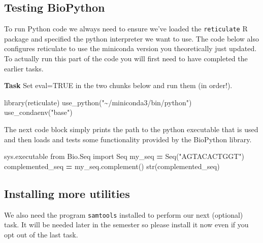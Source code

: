 \documentclass[
]{article}
\newenvironment{Shaded}{\begin{snugshade}}{\end{snugshade}}
\newcommand{\BuiltInTok}[1]{#1}
\newcommand{\FunctionTok}[1]{\textcolor[rgb]{0.00,0.00,0.00}{#1}}
\newcommand{\ImportTok}[1]{#1}
\newcommand{\NormalTok}[1]{#1}
\newcommand{\OperatorTok}[1]{\textcolor[rgb]{0.81,0.36,0.00}{\textbf{#1}}}
\newcommand{\StringTok}[1]{\textcolor[rgb]{0.31,0.60,0.02}{#1}}
\begin{document}
\hypertarget{testing-biopython}{%
\subsection{Testing BioPython}\label{testing-biopython}}

To run Python code we always need to ensure we've loaded the
\texttt{reticulate} R package and specified the python interpreter we
want to use. The code below also configures reticulate to use the
miniconda version you theoretically just updated. To actually run this
part of the code you will first need to have completed the earlier
tasks.

\textbf{Task} Set eval=TRUE in the two chunks below and run them (in
order!).

\begin{Shaded}
\begin{Highlighting}[]
\FunctionTok{library}\NormalTok{(reticulate)}
\FunctionTok{use\_python}\NormalTok{(}\StringTok{"\textasciitilde{}/miniconda3/bin/python"}\NormalTok{)}
\FunctionTok{use\_condaenv}\NormalTok{(}\StringTok{"base"}\NormalTok{)}
\end{Highlighting}
\end{Shaded}

The next code block simply prints the path to the python executable that
is used and then loads and tests some functionality provided by the
BioPython library.

\begin{Shaded}
\begin{Highlighting}[]
\NormalTok{sys.executable}
\ImportTok{from}\NormalTok{ Bio.Seq }\ImportTok{import}\NormalTok{ Seq}
\NormalTok{my\_seq }\OperatorTok{=}\NormalTok{ Seq(}\StringTok{"AGTACACTGGT"}\NormalTok{)}
\NormalTok{complemented\_seq }\OperatorTok{=}\NormalTok{ my\_seq.complement()}
\BuiltInTok{str}\NormalTok{(complemented\_seq)}
\end{Highlighting}
\end{Shaded}

\hypertarget{installing-more-utilities}{%
\subsection{Installing more utilities}\label{installing-more-utilities}}

We also need the program \texttt{samtools} installed to perform our next
(optional) task. It will be needed later in the semester so please
install it now even if you opt out of the last task.
\end{document}
